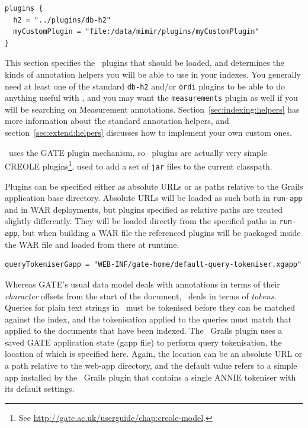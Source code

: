\begin{lstlisting}
plugins {
  h2 = "../plugins/db-h2"
  myCustomPlugin = "file:/data/mimir/plugins/myCustomPlugin"
}
\end{lstlisting}

This section specifies the \Mimir\ plugins that should be loaded, and
determines the kinds of annotation helpers you will be able to use in your
indexes.  You generally need at least one of the standard {\tt db-h2} and/or
{\tt ordi} plugins to be able to do anything useful with \Mimir, and you may
want the {\tt measurements} plugin as well if you will be searching on
Measurement annotations.  Section~\ref{sec:indexing:helpers} has more
information about the standard annotation helpers, and
section~\ref{sec:extend:helpers} discusses how to implement your
own custom ones.

\Mimir\ uses the GATE plugin mechanism, so \Mimir\ plugins are actually
very simple CREOLE plugins\footnote{See
\url{http://gate.ac.uk/userguide/chap:creole-model}.}, used to add a set of
{\tt jar} files to the current classpath.
 
Plugins can be specified either as absolute URLs or as paths relative to the
Grails application base directory.  Absolute URLs will be loaded as such both
in {\tt run-app} and in WAR deployments, but plugins specified as relative
paths are treated slightly differently.  They will be loaded directly from the
specified paths in {\tt run-app}, but when building a WAR file the referenced
plugins will be packaged inside the WAR file and loaded from there at runtime.

\begin{lstlisting}
queryTokeniserGapp = "WEB-INF/gate-home/default-query-tokeniser.xgapp"
\end{lstlisting}

Whereas GATE's usual data model deals with annotations in terms of their {\em
character} offsets from the start of the document, \Mimir\ deals in terms of
{\em tokens}.  Queries for plain text strings in \Mimir\ must be tokenised
before they can be matched against the index, and the tokenisation applied to
the queries must match that applied to the documents that have been indexed.
The \Mimir\ Grails plugin uses a saved GATE application state (gapp file) to
perform query tokenisation, the location of which is specified here.  Again,
the location can be an absolute URL or a path relative to the web-app
directory, and the default value refers to a simple app installed by the
\Mimir\ Grails plugin that contains a single ANNIE tokeniser with its default
settings.


